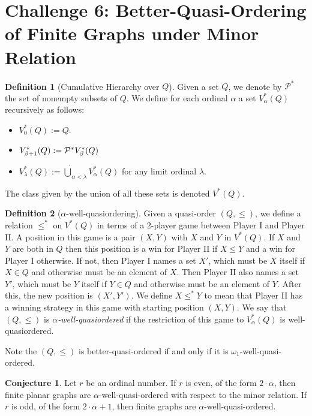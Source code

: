 \documentclass[12pt]{article}
\numberwithin{equation}{section}
\theoremstyle{definition}
\newtheorem{definition}{Definition}
\newtheorem{conjecture}[theorem]{Conjecture}
\begin{document}
\section*{Challenge 6: Better-Quasi-Ordering of Finite Graphs under Minor Relation}

\begin{definition}[Cumulative Hierarchy over $Q$]
Given a set $Q$, we denote by $\mathcal P^*$ the set of nonempty subsets of $Q$. We define for each ordinal $\alpha$ a set $V^*_{\alpha}(Q)$ recursively as follows:
\begin{itemize}
\item $V^*_0(Q) := Q$.
\item $V^*_{\beta + 1}(Q) := {\cal{P}}^* V^*_{\beta}(Q)$
\item $V^*_{\lambda}(Q) := \dot \bigcup_{\alpha < \lambda} V^*_{\alpha}(Q)$ for any limit ordinal $\lambda$.
\end{itemize}

The class given by the union of all these sets is denoted $V^*(Q)$. 
\end{definition}

\begin{definition}[$\alpha$-well-quasiordering]
Given a quasi-order $(Q,\le)$, we define a relation $\le^*$ on $V^*(Q)$ in terms of a 2-player game between Player I and Player II. A position in this game is a pair $(X,Y)$ with $X$ and $Y$ in $V^*(Q)$. If $X$ and $Y$ are both in $Q$ then this position is a win for Player II if $X \le Y$ and a win for Player I otherwise. If not, then Player I names a set $X'$, which must be $X$ itself if $X \in Q$ and otherwise must be an element of $X$. Then Player II also names a set $Y'$, which must be $Y$ itself if $Y \in Q$ and otherwise must be an element of $Y$. After this, the new position is $(X', Y')$. We define $X \le^* Y$ to mean that Player II has a winning strategy in this game with starting position $(X,Y)$.
\newline
We say that $(Q, \le)$ is {\em $\alpha$-well-quasiordered} if the restriction of this game to $V^*_{\alpha}(Q)$ is well-quasiordered.
\end{definition}

Note the $(Q, \le)$ is better-quasi-ordered if and only if it is $\omega_1$-well-quasi-ordered.

\begin{conjecture}
Let $r$ be an ordinal number. If $r$ is even, of the form $2 \cdot \alpha$, then finite planar graphs are $\alpha$-well-quasi-ordered with respect to the minor relation. If $r$ is odd, of the form $2 \cdot \alpha + 1$, then finite graphs are $\alpha$-well-quasi-ordered.
\end{conjecture}

\printbibliography
\end{document}

